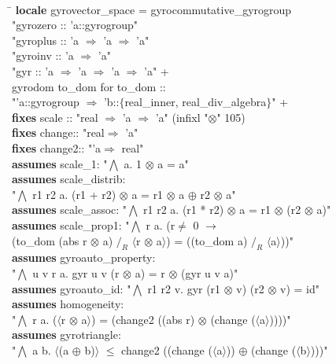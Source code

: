 \documentclass[a4paper]{article}
\newcommand{\tab}{\hspace{5mm}}
\theoremstyle{definition}
\begin{document}
\begin{small}
{\tt
\begin{tabbing}
\hspace{5mm}\=\kill
{\bf locale} gyrovector\_space = 
  gyrocommutative\_gyrogroup \\ "gyrozero :: 'a::gyrogroup" \\
                            "gyroplus :: 'a $\Rightarrow$ 'a $\Rightarrow$ 'a"  \\
                            "gyroinv :: 'a $\Rightarrow$ 'a"\\
                            "gyr :: 'a $\Rightarrow$ 'a $\Rightarrow$ 'a $\Rightarrow$ 'a" + \\
  gyrodom to\_dom for to\_dom :: \\ "'a::gyrogroup $\Rightarrow$ 'b::$\{$real\_inner, real\_div\_algebra$\}$" +\\
\> {\bf fixes} scale ::  "real $\Rightarrow$ 'a $\Rightarrow$ 'a" (infixl "$\otimes$" 105)\\ 
\> {\bf fixes} change:: "real$\Rightarrow$ 'a"\\
\> {\bf fixes} change2:: "'a$\Rightarrow$ real"\\
\> {\bf assumes} scale\_1: "$\bigwedge$ a. 1 $\otimes$ a = a"\\
\> {\bf assumes} scale\_distrib:\\ \tab \tab "$\bigwedge$ r1 r2 a. (r1 + r2) $\otimes$ a = r1 $\otimes$ a $\oplus$ r2 $\otimes$ a"\\
\> {\bf assumes} scale\_assoc: "$\bigwedge$ r1 r2 a. (r1 * r2) $\otimes$ a = r1 $\otimes$ (r2 $\otimes$ a)"\\
\> {\bf assumes} scale\_prop1: "$\bigwedge$ r a. (r$\neq$ 0 $\longrightarrow$ \\(to\_dom (abs r $\otimes$ a) $/_R$ $\langle$r $\otimes$ a$\rangle$) = ((to\_dom a) $/_R$ $\langle$a$\rangle$))"\\ 
\> {\bf assumes} gyroauto\_property: \\ \tab \tab "$\bigwedge$ u v r a. gyr u v (r $\otimes$ a) = r $\otimes$ (gyr u v a)"\\
\> {\bf assumes} gyroauto\_id: "$\bigwedge$ r1 r2 v. gyr (r1 $\otimes$ v) (r2 $\otimes$ v) = id"\\
\> {\bf assumes} homogeneity: \\ \tab \tab"$\bigwedge$ r a.  ($\langle$r $\otimes$ a$\rangle$) =  (change2 ((abs r) $\otimes$ (change ($\langle$a$\rangle$))))"\\
\> {\bf assumes} gyrotriangle: \\ \tab \tab "$\bigwedge$ a b. $\langle$(a $\oplus$ b)$\rangle$ $\leq$ change2 ((change ($\langle$a$\rangle$)) $\oplus$ (change ($\langle$b$\rangle$)))"\\
\end{tabbing}
}
\end{small}
\end{document}
